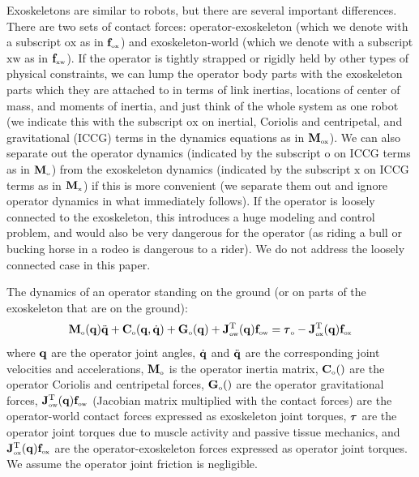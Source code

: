 \documentclass[letterpaper,12pt,fullpage]{article}
\newcommand{\myo}{{\mbox {\tiny o}}}
\newcommand{\myx}{{\mbox {\tiny x}}}
\newcommand{\ox}{{\mbox {\tiny ox}}}
\newcommand{\ow}{{\mbox {\tiny ow}}}
\newcommand{\xw}{{\mbox {\tiny xw}}}
\begin{document}
Exoskeletons are similar to robots, but there are several important differences.
There are two sets of contact forces: operator-exoskeleton (which we denote
with a subscript ${\mbox {ox}}$ as in $\vf_{\ox}$) and exoskeleton-world (which we denote
with a subscript ${\mbox {xw}}$ as in $\vf_{\xw}$). If the operator is tightly strapped or
rigidly held by other types of physical constraints, we can lump the operator
body parts with the exoskeleton parts which they are attached to in terms
of link inertias, locations of center of mass, and moments of inertia,
and just think of the whole system as one robot (we indicate this with
the subscript ${\mbox {ox}}$ on inertial, Coriolis and centripetal, and gravitational (ICCG)
terms in the dynamics equations as in $\mM_{\ox}$).
We can also separate out the operator dynamics (indicated by
the subscript ${\mbox {o}}$ on ICCG terms as in $\mM_{\myo}$) from the exoskeleton dynamics (indicated by
the subscript ${\mbox {x}}$ on ICCG terms as in $\mM_{\myx}$) if this is more convenient
(we separate them out and ignore operator dynamics in what immediately follows).
If the operator is loosely connected to the exoskeleton, this introduces a
huge modeling and control problem, and would also be very dangerous for the
operator (as riding a bull or bucking horse in a rodeo is dangerous to a rider).
We do not address the loosely connected case in this paper.

The dynamics of an operator standing on the ground (or on parts of the exoskeleton
that are on the ground):
\begin{equation}
\mM_{\myo}(\vq) \ddot{\vq} + \mC_{\myo}(\vq,\dot{\vq}) + \mG_{\myo}(\vq)
+ \mJ_{\ow}^{\tr}(\vq) \vf_{\ow} = \vtau_{\myo} - \mJ_{\ox}^{\tr}(\vq) \vf_{\ox}
\label{eq:odynamics}
\end{equation}
where ${\bf q}$ are the operator joint angles,
$\dot{{\bf q}}$ and $\ddot{{\bf q}}$ are the corresponding
joint velocities and accelerations,
$\mM_{\myo}$ is the operator inertia matrix, 
$\mC_{\myo}()$ are the operator Coriolis and
centripetal forces, 
$\mG_{\myo}()$ are the operator gravitational forces,
$\mJ_{\ow}^{\tr}(\vq) \vf_{\ow}$ (Jacobian matrix multiplied with the
contact forces) are the operator-world contact forces 
expressed as exoskeleton joint torques, 
$\vtau$ are the operator joint torques due to muscle activity and passive tissue
mechanics,
and 
$\mJ_{\ox}^{\tr}(\vq) \vf_{\ox}$
are the operator-exoskeleton forces expressed
as operator joint torques.
We assume the operator joint friction is negligible.
\end{document}

